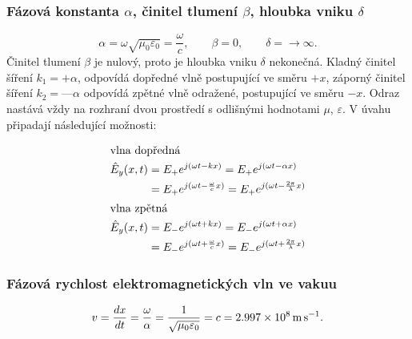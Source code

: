       \subsubsection{Fázová konstanta \(\alpha\), činitel tlumení \(\beta\), hloubka 
                         vniku \(\delta\)}
        \begin{equation}\label{ES:eq_elmagp37}
          \alpha = \omega\sqrt{\mu_0\varepsilon_0} = \frac{\omega}{c}, \qquad 
          \beta  = 0,                                                  \qquad
           \delta = \rightarrow\infty.
        \end{equation}
        Činitel tlumení \(\beta\) je nulový, proto je hloubka vniku \(\delta\) nekonečná. Kladný 
        činitel šíření \(k_1 = +\alpha\), odpovídá dopředné vlně postupující ve směru \(+x\), 
        záporný činitel šíření \(k_2 = —\alpha\) odpovídá zpětné vlně odražené, postupující ve 
        směru \(-x\). Odraz nastává vždy na rozhraní dvou prostředí s odlišnými hodnotami \(\mu\), 
        \(\varepsilon\). V úvahu připadají následující možnosti:
        
        \begin{subequations}
          \begin{align}
            \shortintertext{vlna dopředná}
            \hat{E}_y(x,t) 
              &= E_+e^{j(\omega t - kx)} 
               = E_+e^{j(\omega t - \alpha x)}                    \nonumber \\
              &= E_+e^{j(\omega t - \frac{\omega}{c}x)}
               = E_+e^{j(\omega t - \frac{2\pi}{\lambda}x)}       \label{ES:eq_elmagp38a}   \\
            \shortintertext{vlna zpětná}
            \hat{E}_y(x,t) 
              &= E_-e^{j(\omega t + kx)}
               = E_-e^{j(\omega t + \alpha x)}                    \nonumber \\
              &= E_-e^{j(\omega t + \frac{\omega}{c}x)} 
               = E_-e^{j(\omega t + \frac{2\pi}{\lambda}x)}       \label{ES:eq_elmagp38b}
          \end{align}
        \end{subequations}

      \subsubsection{Fázová rychlost elektromagnetických vln ve vakuu}
        \begin{equation}\label{ES:eq_elmagp39}
          v = \dfrac{d x}{d t} = \frac{\omega}{\alpha} = \frac{1}{\sqrt{\mu_0\varepsilon_0}}
            = c 
            = \SI{2.997e8}{\meter\per\second}.
        \end{equation}

